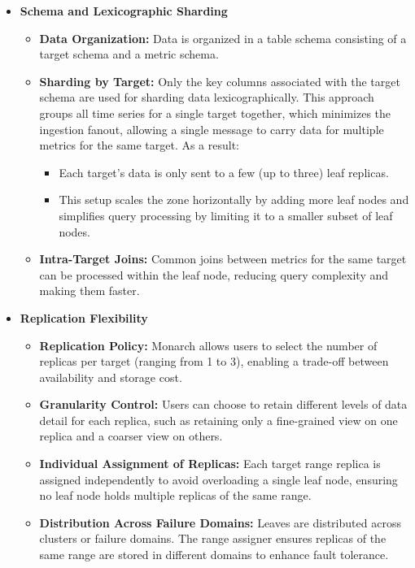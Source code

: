 \begin{itemize}
    \item \textbf{Schema and Lexicographic Sharding}
    \begin{itemize}
        \item \textbf{Data Organization:} Data is organized in a table schema consisting of a target schema and a metric schema.
        \item \textbf{Sharding by Target:} Only the key columns associated with the target schema are used for sharding data lexicographically. This approach groups all time series for a single target together, which minimizes the ingestion fanout, allowing a single message to carry data for multiple metrics for the same target. As a result:
        \begin{itemize}
            \item Each target's data is only sent to a few (up to three) leaf replicas.
            \item This setup scales the zone horizontally by adding more leaf nodes and simplifies query processing by limiting it to a smaller subset of leaf nodes.
        \end{itemize}
        \item \textbf{Intra-Target Joins:} Common joins between metrics for the same target can be processed within the leaf node, reducing query complexity and making them faster.
    \end{itemize}

    \item \textbf{Replication Flexibility}
    \begin{itemize}
        \item \textbf{Replication Policy:} Monarch allows users to select the number of replicas per target (ranging from 1 to 3), enabling a trade-off between availability and storage cost.
        \item \textbf{Granularity Control:} Users can choose to retain different levels of data detail for each replica, such as retaining only a fine-grained view on one replica and a coarser view on others.
        \item \textbf{Individual Assignment of Replicas:} Each target range replica is assigned independently to avoid overloading a single leaf node, ensuring no leaf node holds multiple replicas of the same range.
        \item \textbf{Distribution Across Failure Domains:} Leaves are distributed across clusters or failure domains. The range assigner ensures replicas of the same range are stored in different domains to enhance fault tolerance.
    \end{itemize}


\end{itemize}
